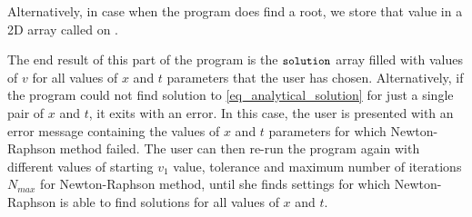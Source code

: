 Alternatively, in case when the program does find a root, we store that value in a 2D array called  on .

The end result of this part of the program is the $\texttt{\small solution}$ array filled with values of $v$ for all values of $x$ and $t$ parameters that the user has chosen. Alternatively, if the program could not find solution to \autoref{eq_analytical_solution} for just a single pair of $x$ and $t$, it exits with an error. In this case, the user is presented with an error message containing the values of $x$ and $t$ parameters for which Newton-Raphson method failed. The user can then re-run the program again with different values of starting $v_1$ value, tolerance and maximum number of iterations $N_{max}$ for Newton-Raphson method, until she finds settings for which Newton-Raphson is able to find solutions for all values of $x$ and $t$.




